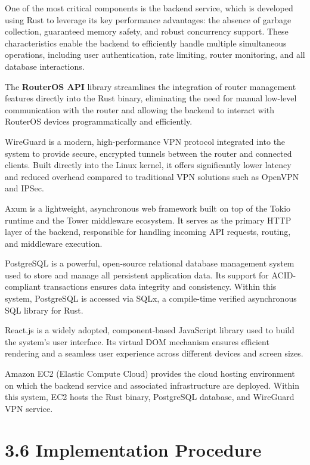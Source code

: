 \documentclass[12pt,a4paper,oneside]{report}
\begin{document}
One of the most critical components is the backend service, which is developed using Rust to leverage its key performance advantages: the absence of garbage collection, guaranteed memory safety, and robust concurrency support. These characteristics enable the backend to efficiently handle multiple simultaneous operations, including user authentication, rate limiting, router monitoring, and all database interactions.

The \textbf{RouterOS API} library streamlines the integration of router management features directly into the Rust binary, eliminating the need for manual low-level communication with the router and allowing the backend to interact with RouterOS devices programmatically and efficiently.

WireGuard is a modern, high-performance VPN protocol integrated into the system to provide secure, encrypted tunnels between the router and connected clients. Built directly into the Linux kernel, it offers significantly lower latency and reduced overhead compared to traditional VPN solutions such as OpenVPN and IPSec.

Axum is a lightweight, asynchronous web framework built on top of the Tokio runtime and the Tower middleware ecosystem. It serves as the primary HTTP layer of the backend, responsible for handling incoming API requests, routing, and middleware execution.

PostgreSQL is a powerful, open-source relational database management system used to store and manage all persistent application data. Its support for ACID-compliant transactions ensures data integrity and consistency. Within this system, PostgreSQL is accessed via SQLx, a compile-time verified asynchronous SQL library for Rust.

React.js is a widely adopted, component-based JavaScript library used to build the system's user interface. Its virtual DOM mechanism ensures efficient rendering and a seamless user experience across different devices and screen sizes.

Amazon EC2 (Elastic Compute Cloud) provides the cloud hosting environment on which the backend service and associated infrastructure are deployed. Within this system, EC2 hosts the Rust binary, PostgreSQL database, and WireGuard VPN service.

\section{3.6 Implementation Procedure}
\end{document}

